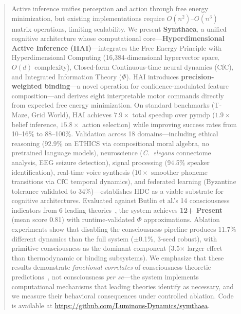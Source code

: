 \documentclass[10pt,letterpaper]{article}
\renewcommand{\Phi}{\varPhi}
\begin{document}
\begin{abstract}
Active inference unifies perception and action through free energy minimization, but existing implementations require $O(n^2)$--$O(n^3)$ matrix operations, limiting scalability.
We present \textbf{Symthaea}, a unified cognitive architecture whose computational core---\textbf{Hyperdimensional Active Inference (HAI)}---integrates the Free Energy Principle with Hyperdimensional Computing (16,384-dimensional hypervector space, $O(d)$ complexity), Closed-form Continuous-time neural dynamics (CfC), and Integrated Information Theory ($\Phi$).
HAI introduces \textbf{precision-weighted binding}---a novel operation for confidence-modulated feature composition---and derives eight interpretable motor commands directly from expected free energy minimization.
On standard benchmarks (T-Maze, Grid World), HAI achieves $7.9\times$ total speedup over pymdp ($1.9\times$ belief inference, $15.8\times$ action selection) while improving success rates from 10--16\% to 88--100\%.
Validation across 18 domains---including ethical reasoning (92.9\% on ETHICS via compositional moral algebra, no pretrained language models), neuroscience (\emph{C.~elegans} connectome analysis, EEG seizure detection), signal processing (94.5\% speaker identification), real-time voice synthesis ($10{\times}$ smoother phoneme transitions via CfC temporal dynamics), and federated learning (Byzantine tolerance validated to 34\%)---establishes HDC as a viable substrate for cognitive architectures.
Evaluated against Butlin et al.'s 14 consciousness indicators from 6 leading theories~\cite{butlin2023consciousness}, the system achieves \textbf{12+ Present} (mean score 0.81) with runtime-validated $\Phi$ approximations.
Ablation experiments show that disabling the consciousness pipeline produces 11.7\% different dynamics than the full system ($\pm$0.1\%, 3-seed robust), with primitive consciousness as the dominant component (3.5$\times$ larger effect than thermodynamic or binding subsystems).
We emphasize that these results demonstrate \emph{functional correlates} of consciousness-theoretic predictions~\cite{phua2025ablations}, not consciousness \emph{per se}---the system implements computational mechanisms that leading theories identify as necessary, and we measure their behavioral consequences under controlled ablation.
Code is available at \url{https://github.com/Luminous-Dynamics/symthaea}.
\end{abstract}
\end{document}
